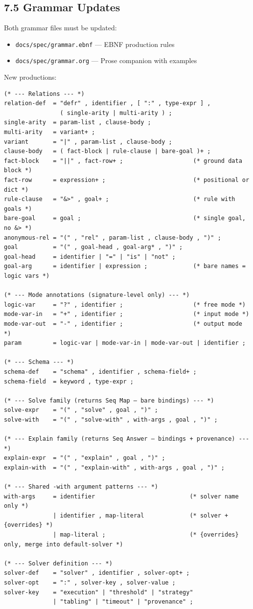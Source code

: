 \documentclass[11pt]{article}
\begin{document}
\subsection{7.5 Grammar Updates}
\label{sec:orgc391787}

Both grammar files must be updated:
\begin{itemize}
\item \texttt{docs/spec/grammar.ebnf} — EBNF production rules
\item \texttt{docs/spec/grammar.org} — Prose companion with examples
\end{itemize}

New productions:

\begin{verbatim}
(* --- Relations --- *)
relation-def  = "defr" , identifier , [ ":" , type-expr ] ,
                ( single-arity | multi-arity ) ;
single-arity  = param-list , clause-body ;
multi-arity   = variant+ ;
variant       = "|" , param-list , clause-body ;
clause-body   = ( fact-block | rule-clause | bare-goal )+ ;
fact-block    = "||" , fact-row+ ;                    (* ground data block *)
fact-row      = expression+ ;                         (* positional or dict *)
rule-clause   = "&>" , goal+ ;                        (* rule with goals *)
bare-goal     = goal ;                                (* single goal, no &> *)
anonymous-rel = "(" , "rel" , param-list , clause-body , ")" ;
goal          = "(" , goal-head , goal-arg* , ")" ;
goal-head     = identifier | "=" | "is" | "not" ;
goal-arg      = identifier | expression ;             (* bare names = logic vars *)

(* --- Mode annotations (signature-level only) --- *)
logic-var     = "?" , identifier ;                    (* free mode *)
mode-var-in   = "+" , identifier ;                    (* input mode *)
mode-var-out  = "-" , identifier ;                    (* output mode *)
param         = logic-var | mode-var-in | mode-var-out | identifier ;

(* --- Schema --- *)
schema-def    = "schema" , identifier , schema-field+ ;
schema-field  = keyword , type-expr ;

(* --- Solve family (returns Seq Map — bare bindings) --- *)
solve-expr    = "(" , "solve" , goal , ")" ;
solve-with    = "(" , "solve-with" , with-args , goal , ")" ;

(* --- Explain family (returns Seq Answer — bindings + provenance) --- *)
explain-expr  = "(" , "explain" , goal , ")" ;
explain-with  = "(" , "explain-with" , with-args , goal , ")" ;

(* --- Shared -with argument patterns --- *)
with-args     = identifier                           (* solver name only *)
              | identifier , map-literal             (* solver + {overrides} *)
              | map-literal ;                        (* {overrides} only, merge into default-solver *)

(* --- Solver definition --- *)
solver-def    = "solver" , identifier , solver-opt+ ;
solver-opt    = ":" , solver-key , solver-value ;
solver-key    = "execution" | "threshold" | "strategy"
              | "tabling" | "timeout" | "provenance" ;
\end{verbatim}
\end{document}

